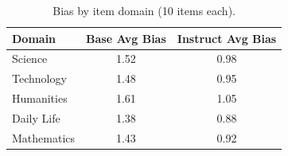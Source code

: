 \begin{table}[h]
\centering\small
\caption{Bias by item domain (10 items each).}
\label{tab:domain}
\begin{tabular}{lcc}
\toprule
Domain & Base Avg Bias & Instruct Avg Bias \\
\midrule
Science & 1.52 & 0.98 \\
Technology & 1.48 & 0.95 \\
Humanities & 1.61 & 1.05 \\
Daily Life & 1.38 & 0.88 \\
Mathematics & 1.43 & 0.92 \\
\bottomrule
\end{tabular}
\end{table}